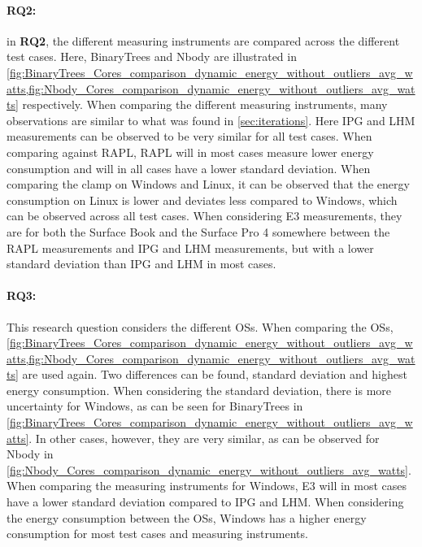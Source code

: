 \paragraph*{RQ2:}  in \textbf{RQ2}, the different measuring instruments are compared across the different test cases. Here, BinaryTrees and Nbody are illustrated in  \cref{fig:BinaryTrees_Cores_comparison_dynamic_energy_without_outliers_avg_watts,fig:Nbody_Cores_comparison_dynamic_energy_without_outliers_avg_watts} respectively. When comparing the different measuring instruments, many observations are similar to what was found in \cref{sec:iterations}. Here IPG and LHM measurements can be observed to be very similar for all test cases. When comparing against RAPL, RAPL will in most cases measure lower energy consumption and will in all cases have a lower standard deviation. When comparing the clamp on Windows and Linux, it can be observed that the energy consumption on Linux is lower and deviates less compared to Windows, which can be observed across all test cases. When considering E3 measurements, they are for both the Surface Book and the Surface Pro 4 somewhere between the RAPL measurements and IPG and LHM measurements, but with a lower standard deviation than IPG and LHM in most cases.




\paragraph*{RQ3:} This research question considers the different OSs. When comparing the OSs, \cref{fig:BinaryTrees_Cores_comparison_dynamic_energy_without_outliers_avg_watts,fig:Nbody_Cores_comparison_dynamic_energy_without_outliers_avg_watts} are used again. Two differences can be found, standard deviation and highest energy consumption. When considering the standard deviation, there is more uncertainty for Windows, as can be seen for BinaryTrees in \cref{fig:BinaryTrees_Cores_comparison_dynamic_energy_without_outliers_avg_watts}. In other cases, however, they are very similar, as can be observed for Nbody in \cref{fig:Nbody_Cores_comparison_dynamic_energy_without_outliers_avg_watts}. When comparing the measuring instruments for Windows, E3 will in most cases have a lower standard deviation compared to IPG and LHM. When considering the energy consumption between the OSs, Windows has a higher energy consumption for most test cases and measuring instruments.

